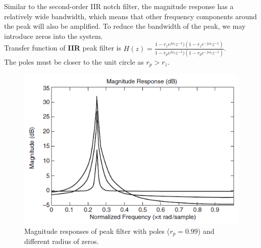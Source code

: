 \noindent Similar to the second-order IIR notch filter, the magnitude response has a relatively wide bandwidth, which means that other frequency components around the peak will also be amplified. 
To reduce the bandwidth of the peak, we may introduce zeros into the system.\\

\noindent Transfer function of \textbf{IIR} peak filter is  $H(z) = \frac{1-r_z e^{j\omega_0} z^{-1})(1- r_z e^{-j\omega_0} z^{-1})}{1-r_p e^{j\omega_0} z^{-1})(1- r_p e^{-j\omega_0} z^{-1})}$.\\

\noindent The poles must be closer to the unit circle as $r_p > r_z$.

\begin{figure} [H]
	\centering
	\includegraphics[width=0.85\linewidth]{graphics/12.png}
	\caption{Magnitude responses of peak filter with poles ($r_p = 0.99$) and different radius of zeros.}
	\label{fig:12}
\end{figure}
